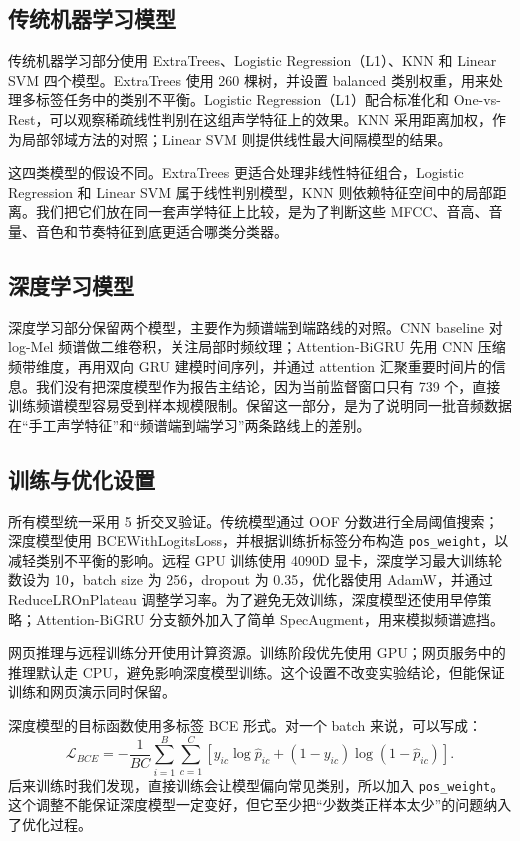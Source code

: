 \documentclass[12pt,a4paper]{article}
\begin{document}
\subsection{传统机器学习模型}
传统机器学习部分使用 ExtraTrees、Logistic Regression（L1）、KNN 和 Linear SVM 四个模型。ExtraTrees 使用 260 棵树，并设置 balanced 类别权重，用来处理多标签任务中的类别不平衡。Logistic Regression（L1）配合标准化和 One-vs-Rest，可以观察稀疏线性判别在这组声学特征上的效果。KNN 采用距离加权，作为局部邻域方法的对照；Linear SVM 则提供线性最大间隔模型的结果。

这四类模型的假设不同。ExtraTrees 更适合处理非线性特征组合，Logistic Regression 和 Linear SVM 属于线性判别模型，KNN 则依赖特征空间中的局部距离。我们把它们放在同一套声学特征上比较，是为了判断这些 MFCC、音高、音量、音色和节奏特征到底更适合哪类分类器。

\subsection{深度学习模型}
深度学习部分保留两个模型，主要作为频谱端到端路线的对照。CNN baseline 对 log-Mel 频谱做二维卷积，关注局部时频纹理；Attention-BiGRU 先用 CNN 压缩频带维度，再用双向 GRU 建模时间序列，并通过 attention 汇聚重要时间片的信息。我们没有把深度模型作为报告主结论，因为当前监督窗口只有 739 个，直接训练频谱模型容易受到样本规模限制。保留这一部分，是为了说明同一批音频数据在“手工声学特征”和“频谱端到端学习”两条路线上的差别。

\subsection{训练与优化设置}
所有模型统一采用 5 折交叉验证。传统模型通过 OOF 分数进行全局阈值搜索；深度模型使用 BCEWithLogitsLoss，并根据训练折标签分布构造 \texttt{pos\_weight}，以减轻类别不平衡的影响。远程 GPU 训练使用 4090D 显卡，深度学习最大训练轮数设为 10，batch size 为 256，dropout 为 0.35，优化器使用 AdamW，并通过 ReduceLROnPlateau 调整学习率。为了避免无效训练，深度模型还使用早停策略；Attention-BiGRU 分支额外加入了简单 SpecAugment，用来模拟频谱遮挡。

网页推理与远程训练分开使用计算资源。训练阶段优先使用 GPU；网页服务中的推理默认走 CPU，避免影响深度模型训练。这个设置不改变实验结论，但能保证训练和网页演示同时保留。

深度模型的目标函数使用多标签 BCE 形式。对一个 batch 来说，可以写成：
\begin{equation}
\mathcal{L}_{BCE}=-\frac{1}{BC}\sum_{i=1}^{B}\sum_{c=1}^{C}
\left[y_{ic}\log\hat{p}_{ic}+(1-y_{ic})\log(1-\hat{p}_{ic})\right].
\end{equation}
后来训练时我们发现，直接训练会让模型偏向常见类别，所以加入 \texttt{pos\_weight}。这个调整不能保证深度模型一定变好，但它至少把“少数类正样本太少”的问题纳入了优化过程。
\end{document}
